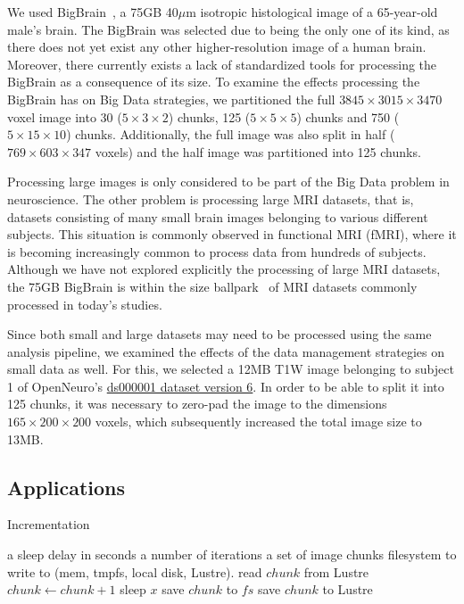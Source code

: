 \documentclass{IEEEtran}
\newcommand{\Desc}[2]{\State \makebox[2em][l]{#1}#2}
\begin{document}
We used BigBrain~\cite{amunts2013bigbrain}, a 75GB 40$\mu$m isotropic 
histological image of a 65-year-old male's brain. The BigBrain was selected due 
to being the only one of its kind, as there does not yet exist any other
higher-resolution image of a human brain. Moreover, there currently exists a 
lack of standardized tools for processing the BigBrain as a consequence 
of its size. To examine the effects processing the BigBrain has on Big Data 
strategies, we partitioned the full $3845\times3015\times3470$ voxel image into 30 ($5\times3\times2$)
chunks, 125 ($5\times5\times5$) chunks and 750 ($5\times15\times10$) chunks. Additionally, the full 
image was also split in half ($769\times603\times347$ voxels) and the half image was 
partitioned into 125 chunks.

Processing large images is only considered to be part of the Big Data problem 
in neuroscience. The other problem is processing large MRI datasets, 
that is, datasets consisting of many small brain images belonging to 
various different subjects. This situation is commonly observed in 
functional MRI (fMRI), where it is becoming increasingly common to 
process data from hundreds of subjects. Although we have not explored 
explicitly the processing of large MRI datasets, the 75GB BigBrain is 
within the size ballpark~\cite{van2014human} of 
MRI datasets commonly processed in today's studies.

Since both small and large datasets may need to be processed using
the same analysis pipeline, we 
examined the effects of the data management strategies on small 
data as well. For this, we selected a 12MB T1W image belonging to 
subject 1 of OpenNeuro's 
\href{https://openneuro.org/datasets/ds000001/versions/00006/file-display/sub-01:anat:sub-01_T1w.nii.gz}{ds000001 
dataset version 6}. In order to be able to split it into 125 chunks, it 
was necessary to zero-pad the image to the dimensions
$165\times200\times200$ voxels, which subsequently increased the total image size to 13MB.

\subsection{Applications} %
\begin{algorithm}\caption{Incrementation}\label{alg:incrementation}
    \begin{algorithmic}[1]
    \Input
    \Desc{$x$}{a sleep delay in seconds}
    \Desc{$n$}{a number of iterations}
    \Desc{$C$}{a set of image chunks}
    \Desc{$fs$}{filesystem to write to (mem, tmpfs, local disk, Lustre).}
    \EndInput
    \State read $chunk$ from Lustre
        \State $chunk\gets chunk+1$
        \State sleep $x$
        \State save $chunk$ to $fs$
        \EndIf
    \EndFor
    \State save $chunk$ to Lustre
    \EndFor
\end{algorithmic}
\end{algorithm}
\end{document}
